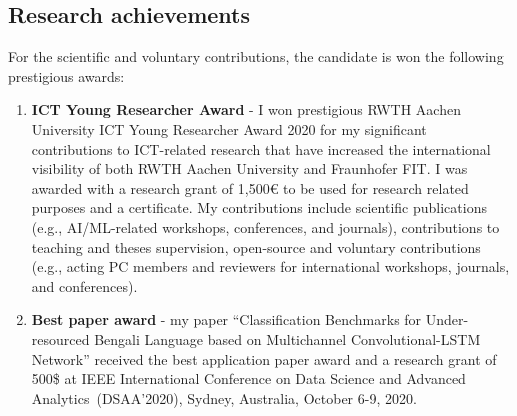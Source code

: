 \subsection{Research achievements}
For the scientific and voluntary contributions, the candidate is won the following prestigious awards: 

\begin{enumerate}[noitemsep]
    \item \textbf{ICT Young Researcher Award} - I won prestigious RWTH Aachen University ICT Young Researcher Award 2020 for my significant contributions to ICT-related research that have increased the international visibility of both RWTH Aachen University and Fraunhofer FIT. I was awarded with a research grant of 1,500€ to be used for research related purposes and a certificate. My contributions include scientific publications (e.g., AI/ML-related workshops, conferences, and journals), contributions to teaching and theses supervision, open-source and voluntary contributions (e.g., acting PC members and reviewers for international workshops, journals, and conferences).
    
	\item \textbf{Best paper award} - my paper ``Classification Benchmarks for Under-resourced Bengali Language based on Multichannel Convolutional-LSTM Network'' received the best application paper award and a research grant of 500\$ at IEEE International Conference on Data Science and Advanced Analytics~(DSAA'2020), Sydney, Australia, October 6-9, 2020.
\end{enumerate}

